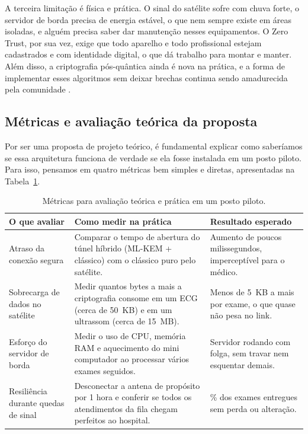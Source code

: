 \documentclass[12pt,a4paper]{article}
\newcommand{\fonte}[1]{\par\vspace{3pt}{\centering\footnotesize Fonte: #1\par}}
\begin{document}
A terceira limitação é física e prática. O sinal do satélite sofre com chuva forte, o servidor de borda precisa de energia estável, o que nem sempre existe em áreas isoladas, e alguém precisa saber dar manutenção nesses equipamentos. O Zero Trust, por sua vez, exige que todo aparelho e todo profissional estejam cadastrados e com identidade digital, o que dá trabalho para montar e manter. Além disso, a criptografia pós-quântica ainda é nova na prática, e a forma de implementar esses algoritmos sem deixar brechas continua sendo amadurecida pela comunidade \cite{bernstein2017pqc}.

\subsection{Métricas e avaliação teórica da proposta}

Por ser uma proposta de projeto teórico, é fundamental explicar como saberíamos se essa arquitetura funciona de verdade se ela fosse instalada em um posto piloto. Para isso, pensamos em quatro métricas bem simples e diretas, apresentadas na Tabela~\ref{tab:metricas}.

\begin{table}[H]
\centering
\caption{Métricas para avaliação teórica e prática em um posto piloto.}
\label{tab:metricas}
\small
\renewcommand{\arraystretch}{1.3}
\begin{tabularx}{\textwidth}{>{\raggedright\arraybackslash}p{3.2cm} >{\raggedright\arraybackslash}X >{\raggedright\arraybackslash}p{3.8cm}}
\toprule
\textbf{O que avaliar} & \textbf{Como medir na prática} & \textbf{Resultado esperado} \\
\midrule
Atraso da conexão segura & Comparar o tempo de abertura do túnel híbrido (ML-KEM + clássico) com o clássico puro pelo satélite. & Aumento de poucos milissegundos, imperceptível para o médico. \\
Sobrecarga de dados no satélite & Medir quantos bytes a mais a criptografia consome em um ECG (cerca de 50~KB) e em um ultrassom (cerca de 15~MB). & Menos de 5~KB a mais por exame, o que quase não pesa no link. \\
Esforço do servidor de borda & Medir o uso de CPU, memória RAM e aquecimento do mini computador ao processar vários exames seguidos. & Servidor rodando com folga, sem travar nem esquentar demais. \\
Resiliência durante quedas de sinal & Desconectar a antena de propósito por 1 hora e conferir se todos os atendimentos da fila chegam perfeitos ao hospital. & 100\% dos exames entregues sem perda ou alteração. \\
\bottomrule
\end{tabularx}
\fonte{elaborada pelo autor (2026).}
\end{table}
\end{document}
